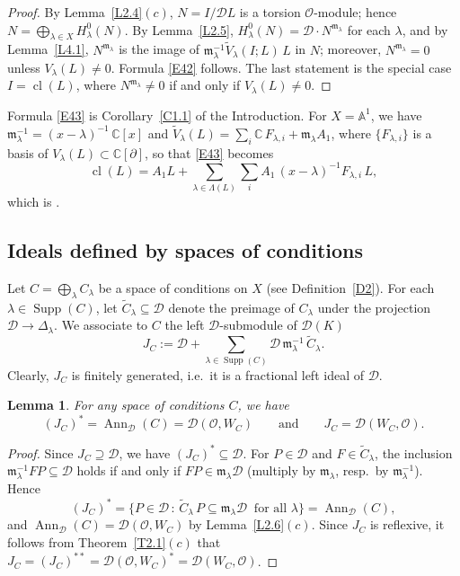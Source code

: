\documentclass[11pt,reqno]{amsart}
\theoremstyle{plain}
\newtheorem{lemma}{Lemma}[section]
\theoremstyle{definition}
\theoremstyle{remark}
\numberwithin{equation}{section}
\newcommand{\cD}{\mathcal{D}}
\newcommand{\cO}{\mathcal{O}}
\newcommand{\C}{\mathbb{C}}
\newcommand{\A}{\mathbb{A}}
\newcommand{\del}{\partial}
\newcommand{\ml}{\mathfrak{m}_\lambda}
\newcommand{\Dl}{\Delta_\lambda}
\DeclareMathOperator{\Ann}{Ann}
\DeclareMathOperator{\cl}{cl}
\DeclareMathOperator{\Supp}{Supp}
\begin{document}
\begin{proof}
By Lemma~\ref{L2.4}$(c)$, $N = I/\cD L$ is a torsion $\cO$-module; hence $N =
\bigoplus_{\lambda \in X} H^0_\lambda(N)$. By Lemma~\ref{L2.5}, $H^0_\lambda(N) = \cD \cdot
N^{\ml}$ for each $\lambda$, and by Lemma~\ref{L4.1}, $N^{\ml}$ is the image of $\ml^{-1}
\widetilde{V}_\lambda(I;L)\, L$ in $N$; moreover, $N^{\ml} = 0$ unless $V_\lambda(L) \ne 0$.
Formula \eqref{E42} follows. The last statement is the special case $I = \cl(L)$, where
$N^{\ml} \ne 0$ if and only if $V_\lambda(L) \ne 0$.
\end{proof}

Formula \eqref{E43} is Corollary~\ref{C1.1} of the Introduction. For $X = \A^1$, we have
$\ml^{-1} = (x - \lambda)^{-1}\, \C[x]$ and $\widetilde{V}_\lambda(L) = \sum_i \C\, F_{\lambda,i} +
\ml A_1$, where $\{F_{\lambda,i}\}$ is a basis of $V_\lambda(L) \subset \C[\del]$, so that
\eqref{E43} becomes
\begin{equation}
\label{E44}
  \cl(L) = A_1 L + \sum_{\lambda \in \Lambda(L)} \sum_{i} A_1\, (x - \lambda)^{-1} F_{\lambda,i}\, L ,
\end{equation}
which is \cite[Algorithm~3.4]{Tsai}.

\subsection{Ideals defined by spaces of conditions}
\label{S4.2}
Let $C = \bigoplus_\lambda C_\lambda$ be a space of conditions on $X$ (see
Definition~\ref{D2}). For each $\lambda \in \Supp(C)$, let $\widetilde{C}_\lambda \subseteq \cD$
denote the preimage of $C_\lambda$ under the projection $\cD \to \Dl$. We associate to $C$ the
left $\cD$-submodule of $\cD(K)$
\begin{equation}
\label{E45}
  J_C := \cD + \sum_{\lambda \in \Supp(C)} \cD\, \ml^{-1}\, \widetilde{C}_\lambda .
\end{equation}
Clearly, $J_C$ is finitely generated, i.e.\ it is a fractional left ideal of $\cD$.

\begin{lemma}
\label{L4.2}
For any space of conditions $C$, we have
\[
  (J_C)^* = \Ann_{\cD}(C) = \cD(\cO, W_C) \qquad \text{and} \qquad J_C = \cD(W_C, \cO) .
\]
\end{lemma}

\begin{proof}
Since $J_C \supseteq \cD$, we have $(J_C)^* \subseteq \cD$. For $P \in \cD$ and $F \in
\widetilde{C}_\lambda$, the inclusion $\ml^{-1} F P \subseteq \cD$ holds if and only if
$F P \in \ml \cD$ (multiply by $\ml$, resp.\ by $\ml^{-1}$). Hence
\[
  (J_C)^* = \{ P \in \cD \, : \, \widetilde{C}_\lambda\, P \subseteq \ml \cD \ \text{ for all }
  \lambda \} = \Ann_{\cD}(C) ,
\]
and $\Ann_{\cD}(C) = \cD(\cO, W_C)$ by Lemma~\ref{L2.6}$(c)$. Since $J_C$ is reflexive, it follows
from Theorem~\ref{T2.1}$(c)$ that $J_C = (J_C)^{**} = \cD(\cO, W_C)^* = \cD(W_C, \cO)$.
\end{proof}
\end{document}
